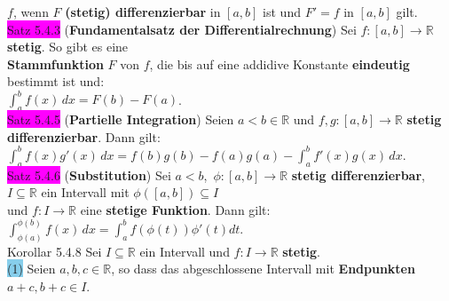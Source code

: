 \documentclass[10pt]{article}
\begin{document}
        \indent \textcolor{NavyBlue}{$f$}, wenn \textcolor{NavyBlue}{$F$} 
                \textbf{(stetig) differenzierbar} in 
                \textcolor{NavyBlue}{$[a,b]$}
                ist und \textcolor{NavyBlue}{$F'=f$} in \textcolor{NavyBlue}{$[a,b]$} gilt.\\
\colorbox{magenta}{Satz 5.4.3} (\textbf{Fundamentalsatz der Differentialrechnung}) 
                Sei \textcolor{NavyBlue}{$f:[a,b]\longrightarrow\mathbb{R}$} 
                \textbf{stetig}. So gibt es eine \\
        \indent \textbf{Stammfunktion} \textcolor{NavyBlue}{$F$} von \textcolor{NavyBlue}{$f$},
                die bis auf eine addidive Konstante \textbf{eindeutig} 
                bestimmt ist und: \\
        \indent \textcolor{NavyBlue}{$\int_a^bf(x)\,dx=F(b)-F(a)$}. \\
\colorbox{magenta}{Satz 5.4.5} (\textbf{Partielle Integration}) 
                Seien \textcolor{NavyBlue}{$a<b\in\mathbb{R}$} und 
                \textcolor{NavyBlue}{$f,g:[a,b]\longrightarrow\mathbb{R}$}
                \textbf{stetig differenzierbar}. Dann gilt: \\
        \indent \textcolor{NavyBlue}{$\int_a^bf(x)g'(x)\,dx
                =f(b)g(b)-f(a)g(a)-\int_a^bf'(x)g(x)\,dx$}. \\
\colorbox{magenta}{Satz 5.4.6} (\textbf{Substitution}) Sei 
                \textcolor{NavyBlue}{$a<b$},\,
                \textcolor{NavyBlue}{$\phi:[a,b]\longrightarrow\mathbb{R}$}
                \textbf{stetig differenzierbar}, \textcolor{NavyBlue}{$I\subseteq\mathbb{R}$}
                ein Intervall mit \textcolor{NavyBlue}{$\phi([a,b])\subseteq I$}\\
        \indent und \textcolor{NavyBlue}{$f:I\longrightarrow\mathbb{R}$} eine 
                \textbf{stetige Funktion}. Dann gilt: 
                \textcolor{NavyBlue}{$\int_{\phi(a)}^{\phi(b)}f(x)\,dx
                =\int_a^bf(\phi(t))\phi'(t)dt$}.\\
\colorbox{BurntOrange}{Korollar 5.4.8} Sei \textcolor{NavyBlue}{$I\subseteq\mathbb{R}$}
                ein Intervall und \textcolor{NavyBlue}{$f:I\longrightarrow\mathbb{R}$} 
                \textbf{stetig}. \\
        \indent \colorbox{SkyBlue}{(1)} Seien \textcolor{NavyBlue}{$a,b,c\in\mathbb{R}$}, 
                so dass das abgeschlossene Intervall 
                mit \textbf{Endpunkten} \textcolor{NavyBlue}{$a+c,b+c\in I$}. \\
\end{document}
